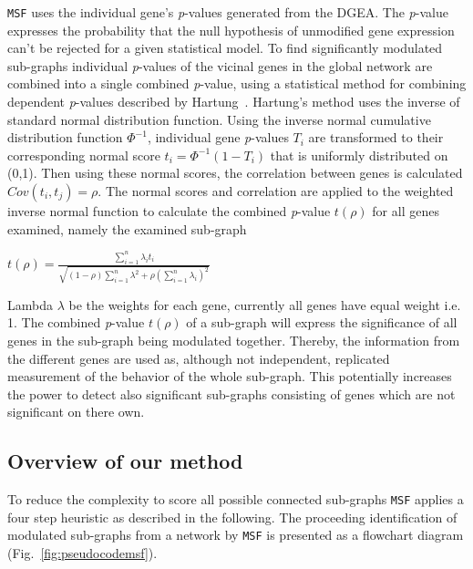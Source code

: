 \documentclass[10pt,a4paper,twocolumn]{article}
\begin{document}
	\texttt{MSF} uses the individual gene's \textit{p}-values generated from
	the DGEA. The \textit{p}-value expresses the probability that the null
	hypothesis of unmodified gene expression can't be rejected for a given
	statistical model. To find significantly modulated sub-graphs individual
	\textit{p}-values of the vicinal genes in the global network are combined
	into a single combined \textit{p}-value, using a statistical method for
	combining dependent \textit{p}-values described by
	Hartung~\cite{Hartung}. Hartung's method uses the inverse of standard
	normal distribution function. Using the inverse normal cumulative distribution function $\Phi^{-1}$, individual gene \textit{p}-values $T_{i}$ are 
	transformed to their corresponding normal score $t_{i}=\Phi^{-1}(1-T_{i})$ that is uniformly distributed on (0,1). Then using these normal
	scores, the correlation between genes is calculated $Cov(t_{i},t_{j})=\rho$. The normal scores and
	correlation are applied to the weighted inverse normal function to calculate the
	combined \textit{p}-value $t(\rho)$ for all genes examined, namely the examined
	sub-graph
	\newline
	\begin{center}
		$t(\rho)=\frac{\sum_{i=1}^{n}\lambda_i t_{i} }{\sqrt{(1-\rho) \sum_{i=1}^{n} \lambda^{2}+\rho(\sum_{i=1}^{n} \lambda_i)^{2}}}$
	\end{center}
	
	Lambda $\lambda$ be the weights for each gene, currently all genes have equal weight i.e. 1. The combined \textit{p}-value  $t(\rho)$ of a sub-graph will express the
	significance of all genes in the sub-graph being modulated
	together. Thereby, the information from the different genes are used as,
	although not independent, replicated measurement of the behavior of the
	whole sub-graph. This potentially increases the power to detect also
	significant sub-graphs consisting of genes which are not significant on
	there own.
	\newline
	
	\subsection*{Overview of our method}
	
	To reduce the complexity to score all possible connected sub-graphs
	\texttt{MSF} applies a four step heuristic as described in the
	following. The proceeding identification of modulated sub-graphs from a
	network by \texttt{MSF} is presented as a flowchart diagram
	(Fig.~\ref{fig:pseudocodemsf}). \newline
	
\end{document}
